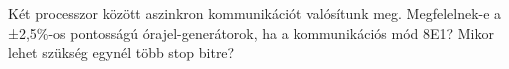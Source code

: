 \begin{example}

Két processzor között aszinkron kommunikációt valósítunk meg. Megfelelnek-e a ±2,5\%-os pontosságú órajel-generátorok, ha a kommunikációs mód 8E1? Mikor lehet szükség egynél több stop bitre?

\tcbline
\vspace{1mm}

\solution

\end{example}
